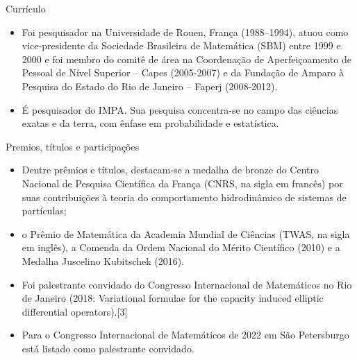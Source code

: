 \documentclass{beamer}
\begin{document}
\begin{frame}{}
    \begin{block}{Currículo}
        \begin{itemize}
            \item Foi pesquisador na Universidade de Rouen, França (1988–1994), atuou como vice-presidente da Sociedade Brasileira de Matemática (SBM) entre 1999 e 2000 e foi membro do comitê de área na Coordenação de Aperfeiçoamento de Pessoal de Nível Superior – Capes (2005-2007) e da Fundação de Amparo à Pesquisa do Estado do Rio de Janeiro – Faperj (2008-2012). 
            \item É pesquisador do IMPA.  Sua pesquisa concentra-se no campo das ciências exatas e da terra, com ênfase em probabilidade e estatística. 
        \end{itemize}
    \end{block}
\end{frame}


\begin{frame}{}
    \begin{block}{Premios, títulos e participações}
        \begin{itemize}
            \item Dentre prêmios e títulos, destacam-se a medalha de bronze do Centro Nacional de Pesquisa Científica da França (CNRS, na sigla em francês) por suas contribuições à teoria do comportamento hidrodinâmico de sistemas de partículas; 
            \item o Prêmio de Matemática da Academia Mundial de Ciências (TWAS, na sigla em inglês), a Comenda da Ordem Nacional do Mérito Científico (2010) e a Medalha Juscelino Kubitschek (2016). 
            \item Foi palestrante convidado do Congresso Internacional de Matemáticos no Rio de Janeiro (2018: Variational formulae for the capacity induced elliptic differential operators).[3]
            \item Para o Congresso Internacional de Matemáticos de 2022 em São Petersburgo está listado como palestrante convidado.
        \end{itemize}
    \end{block}
\end{frame}
\end{document}
